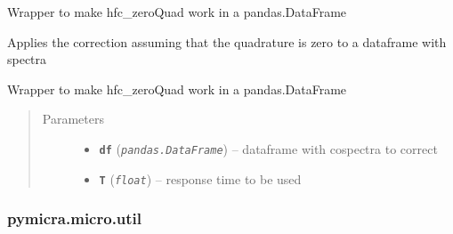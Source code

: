 \documentclass[a4paper,10pt,oneside]{sphinxmanual}
\begin{document}

\begin{fulllineitems}
\label{pymicra.micro:pymicra.micro.spectral.recspeAux}
Wrapper to make hfc\_zeroQuad work in a pandas.DataFrame

\end{fulllineitems}


\begin{fulllineitems}
\label{pymicra.micro:pymicra.micro.spectral.zeroQuadCorrection}
Applies the correction assuming that the quadrature is zero to
a dataframe with spectra

Wrapper to make hfc\_zeroQuad work in a pandas.DataFrame
\begin{quote}\begin{description}
\item[{Parameters}] \leavevmode\begin{itemize}
\item {} 
\textbf{\texttt{df}} (\emph{\texttt{pandas.DataFrame}}) -- dataframe with cospectra to correct

\item {} 
\textbf{\texttt{T}} (\emph{\texttt{float}}) -- response time to be used

\end{itemize}

\end{description}\end{quote}

\end{fulllineitems}



\subsubsection{pymicra.micro.util}
\label{pymicra.micro:pymicra-micro-util}\label{pymicra.micro:module-pymicra.micro.util}
\end{document}
